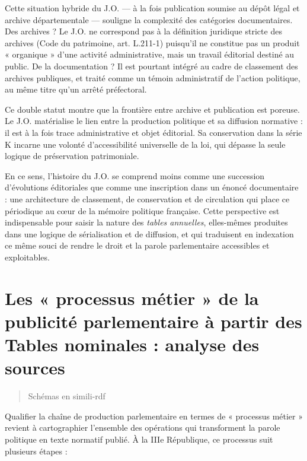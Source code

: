 Cette situation hybride du J.O. — à la fois publication soumise au dépôt légal et archive départementale — souligne la complexité des catégories documentaires. Des archives ? Le J.O. ne correspond pas à la définition juridique stricte des archives (Code du patrimoine, art. L.211-1) puisqu’il ne constitue pas un produit « organique » d’une activité administrative, mais un travail éditorial destiné au public. De la documentation ? Il est pourtant intégré au cadre de classement des archives publiques, et traité comme un témoin administratif de l’action politique, au même titre qu’un arrêté préfectoral.

Ce double statut montre que la frontière entre archive et publication est poreuse. Le J.O. matérialise le lien entre la production politique et sa diffusion normative : il est à la fois trace administrative et objet éditorial. Sa conservation dans la série K incarne une volonté d’accessibilité universelle de la loi, qui dépasse la seule logique de préservation patrimoniale.

En ce sens, l’histoire du J.O. se comprend moins comme une succession d’évolutions éditoriales que comme une inscription dans un énoncé documentaire : une architecture de classement, de conservation et de circulation qui place ce périodique au cœur de la mémoire politique française. Cette perspective est indispensable pour saisir la nature des \emph{tables annuelles}, elles-mêmes produites dans une logique de sérialisation et de diffusion, et qui traduisent en indexation ce même souci de rendre le droit et la parole parlementaire accessibles et exploitables.

\section{Les « processus métier » de la publicité parlementaire à partir des Tables nominales : analyse des sources}

\begin{quote}
Schémas en simili-rdf 

\end{quote}
Qualifier la chaîne de production parlementaire en termes de « processus métier » revient à cartographier l’ensemble des opérations qui transforment la parole politique en texte normatif publié. À la IIIe République, ce processus suit plusieurs étapes :

